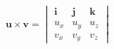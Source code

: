 \documentclass[preview]{standalone}
\begin{document}
\begin{align*}
\mathbf{u} \times \mathbf{v} = \begin{vmatrix} \mathbf{i} & \mathbf{j} & \mathbf{k} \\ u_x & u_y & u_z \\ v_x & v_y & v_z \end{vmatrix}
\end{align*}
\end{document}

